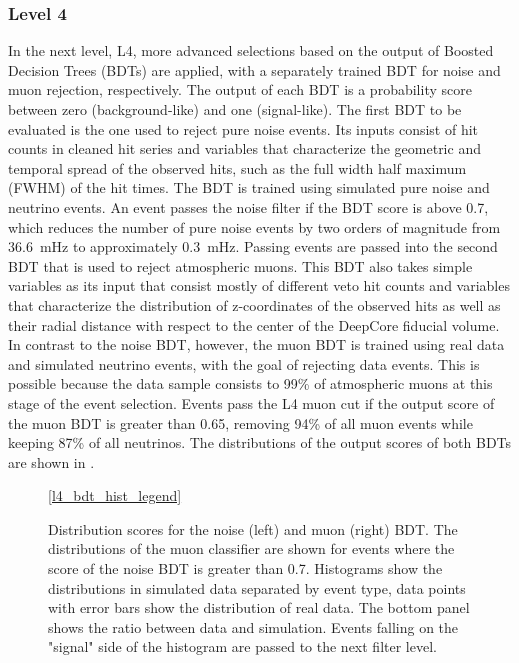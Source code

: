 \subsubsection{Level 4}
\label{sec:level4-selection}
In the next level, L4, more advanced selections based on the output of Boosted Decision Trees (BDTs) are applied, with a separately trained BDT for noise and muon rejection, respectively. The output of each BDT is a probability score between zero (background-like) and one (signal-like). The first BDT to be evaluated is the one used to reject pure noise events. Its inputs consist of hit counts in cleaned hit series and variables that characterize the geometric and temporal spread of the observed hits, such as the full width half maximum (FWHM) of the hit times. The BDT is trained using simulated pure noise and neutrino events. An event passes the noise filter if the BDT score is above 0.7, which reduces the number of pure noise events by two orders of magnitude from 36.6~mHz to approximately 0.3~mHz. Passing events are passed into the second BDT that is used to reject atmospheric muons. This BDT also takes simple variables as its input that consist mostly of different veto hit counts and variables that characterize the distribution of z-coordinates of the observed hits as well as their radial distance with respect to the center of the DeepCore fiducial volume. In contrast to the noise BDT, however, the muon BDT is trained using real data and simulated neutrino events, with the goal of rejecting data events. This is possible because the data sample consists to 99\% of atmospheric muons at this stage of the event selection.
Events pass the L4 muon cut if the output score of the muon BDT is greater than 0.65, removing 94\% of all muon events while keeping 87\% of all neutrinos. The distributions of the output scores of both BDTs are shown in .
\begin{figure}
    \centering
    \ref{l4_bdt_hist_legend}\hfill
    
    

    \caption{Distribution scores for the noise (left) and muon (right) BDT. The distributions of the muon classifier are shown for events where the score of the noise BDT is greater than 0.7. Histograms show the distributions in simulated data separated by event type, data points with error bars show the distribution of real data. The bottom panel shows the ratio between data and simulation. Events falling on the "signal" side of the histogram are passed to the next filter level.}
    \label{fig:l4-bdt-output}
\end{figure}

